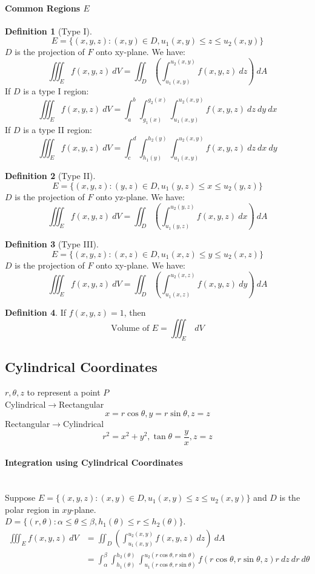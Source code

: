 \documentclass[12 pt]{article}
\theoremstyle{definition}
\newtheorem{defn}{Definition}
\begin{document}
\paragraph{Common Regions $E$}
\begin{defn}[Type I]
  $$E=\{(x,y,z):(x,y)\in D, u_1(x,y)\leq z \leq u_2(x,y)\}$$
  $D$ is the projection of $F$ onto xy-plane. We have:
  $$ \iiint_E f(x,y,z)\ dV = \iint_D \left(\int_{u_1(x,y)}^{u_2(x,y)}f(x,y,z)\ dz\right)\ dA$$
  If $D$ is a type I region:
  $$\iiint_E f(x,y,z)\ dV = \int_a^b\int_{g_1(x)}^{g_2(x)}\int_{u_1(x,y)}^{u_2(x,y)}f(x,y,z)\ dz \ dy \ dx $$
  If $D$ is a type II region:
  $$\iiint_E f(x,y,z)\ dV = \int_c^d\int_{h_1(y)}^{h_2(y)}\int_{u_1(x,y)}^{u_2(x,y)}f(x,y,z)\ dz \ dx \ dy $$
\end{defn}
\begin{defn}[Type II]
  $$E=\{(x,y,z):(y,z)\in D, u_1(y,z)\leq x \leq u_2(y,z)\}$$
  $D$ is the projection of $F$ onto yz-plane. We have:
  $$ \iiint_E f(x,y,z)\ dV = \iint_D \left(\int_{u_1(y,z)}^{u_2(y,z)}f(x,y,z)\ dx\right)\ dA$$
  
\end{defn}
\begin{defn}[Type III]
  
  $$E=\{(x,y,z):(x,z)\in D, u_1(x,z)\leq y \leq u_2(x,z)\}$$
  $D$ is the projection of $F$ onto xy-plane. We have:
  $$ \iiint_E f(x,y,z)\ dV = \iint_D \left(\int_{u_1(x,z)}^{u_2(x,z)}f(x,y,z)\ dy\right)\ dA$$
\end{defn}
\begin{defn}
  If $f(x,y,z)=1$, then
  $$ \text{Volume of }E=\iiint_{E}\ dV$$
\end{defn}
\subsection{Cylindrical Coordinates}
$r,\theta,z$ to represent a point $P$
\\
Cylindrical$\to$Rectangular
$$x=r\cos \theta,y=r\sin\theta,z=z$$
Rectangular$\to$Cylindrical
$$r^2=x^2+y^2,\tan\theta=\frac{y}{x},z=z$$
\paragraph{Integration using Cylindrical Coordinates}
~\\Suppose $E=\{(x,y,z):(x,y)\in D,u_1(x,y)\leq z \leq u_2(x,y)\}$ and $D$ is the polar region in $xy$-plane. \\$D=\{(r,\theta):\alpha \leq \theta \leq \beta, h_1(\theta)\leq r \leq h_2(\theta)\}$.
\begin{align*}
  \iiint_{E}f(x,y,z)\ dV &= \iint_{D}\left(\int_{u_1(x,y)}^{u_2(x,y)}f(x,y,z)\ dz\right)\ dA
                           \\&=\int_{\alpha}^{\beta}\int_{h_1(\theta)}^{h_2(\theta)}\int_{u_1(r\cos\theta,r\sin\theta)}^{u_2(r\cos\theta,r\sin\theta)}f(r\cos\theta,r\sin\theta,z)r\ dz \ dr \ d\theta
\end{align*}
\end{document}

